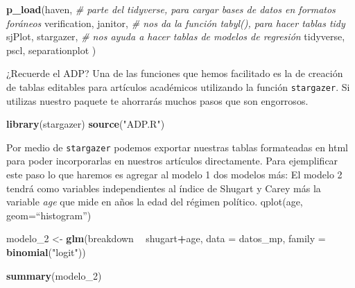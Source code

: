 \documentclass[]{book}
\newenvironment{Shaded}{\begin{snugshade}}{\end{snugshade}}
\newcommand{\KeywordTok}[1]{\textcolor[rgb]{0.13,0.29,0.53}{\textbf{#1}}}
\newcommand{\DataTypeTok}[1]{\textcolor[rgb]{0.13,0.29,0.53}{#1}}
\newcommand{\DecValTok}[1]{\textcolor[rgb]{0.00,0.00,0.81}{#1}}
\newcommand{\StringTok}[1]{\textcolor[rgb]{0.31,0.60,0.02}{#1}}
\newcommand{\CommentTok}[1]{\textcolor[rgb]{0.56,0.35,0.01}{\textit{#1}}}
\newcommand{\OperatorTok}[1]{\textcolor[rgb]{0.81,0.36,0.00}{\textbf{#1}}}
\newcommand{\NormalTok}[1]{#1}
\begin{document}
\begin{Shaded}
\begin{Highlighting}[]
\KeywordTok{p_load}\NormalTok{(haven,    }\CommentTok{# parte del tidyverse, para cargar bases de datos en formatos foráneos}
\NormalTok{       verification,}
\NormalTok{       janitor,  }\CommentTok{# nos da la función tabyl(), para hacer tablas tidy}
\NormalTok{       sjPlot,}
\NormalTok{       stargazer, }\CommentTok{# nos ayuda a hacer tablas de modelos de regresión}
\NormalTok{       tidyverse,}
\NormalTok{       pscl,}
\NormalTok{       separationplot}
\NormalTok{       )}
\end{Highlighting}
\end{Shaded}

¿Recuerde el ADP? Una de las funciones que hemos facilitado es la de
creación de tablas editables para artículos académicos utilizando la
función \texttt{stargazer}. Si utilizas nuestro paquete te ahorrarás
muchos pasos que son engorrosos.

\begin{Shaded}
\begin{Highlighting}[]
\KeywordTok{library}\NormalTok{(stargazer)}
\KeywordTok{source}\NormalTok{(}\StringTok{"ADP.R"}\NormalTok{)}
\end{Highlighting}
\end{Shaded}

Por medio de \texttt{stargazer} podemos exportar nuestras tablas
formateadas en html para poder incorporarlas en nuestros artículos
directamente. Para ejemplificar este paso lo que haremos es agregar al
modelo 1 dos modelos más: El modelo 2 tendrá como variables
independientes al índice de Shugart y Carey más la variable \emph{age}
que mide en años la edad del régimen político. qplot(age,
geom=``histogram'')

\begin{Shaded}
\begin{Highlighting}[]
\NormalTok{modelo_}\DecValTok{2}\NormalTok{ <-}\StringTok{ }\KeywordTok{glm}\NormalTok{(breakdown }\OperatorTok{~}\StringTok{ }\NormalTok{shugart}\OperatorTok{+}\NormalTok{age, }
                \DataTypeTok{data   =}\NormalTok{ datos_mp,}
                \DataTypeTok{family =} \KeywordTok{binomial}\NormalTok{(}\StringTok{"logit"}\NormalTok{))}
\end{Highlighting}
\end{Shaded}

\begin{Shaded}
\begin{Highlighting}[]
\KeywordTok{summary}\NormalTok{(modelo_}\DecValTok{2}\NormalTok{)}
\end{Highlighting}
\end{Shaded}
\end{document}

